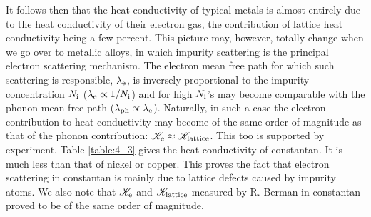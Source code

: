 It follows then that the heat conductivity of typical metals is almost entirely due to the heat conductivity of their electron gas, the contribution of lattice heat conductivity being a few percent. This picture may, however, totally change when we go over to metallic alloys, in which impurity scattering is the principal electron scattering mechanism. The electron mean free path for which such scattering is responsible, $\lambda_{\text{e}}$, is inversely proportional to the impurity concentration $N_{\text{i}}$ ($\lambda_{\text{e}}\propto 1/N_{\text{i}}$) and for high $N_{\text{i}}$'s may become comparable with the phonon mean free path ($\lambda_{\text{ph}}\propto\lambda_{\text{e}}$). Naturally, in such a case the electron contribution to heat conductivity may become of the same order of magnitude as that of the phonon contribution: $\mathscr{K}_{\text{e}}\approx\mathscr{K}_{\text{lattice}}$.
This too is supported by experiment. Table \ref{table:4_3} gives the heat conductivity of constantan. It is much less than that of nickel or copper. This proves the fact that electron scattering in constantan is mainly due to lattice defects caused by impurity atoms. We also note that $\mathscr{K}_{\text{e}}$ and $\mathscr{K}_{\text{lattice}}$ measured by R. Berman in constantan proved to be of the same order of magnitude.

